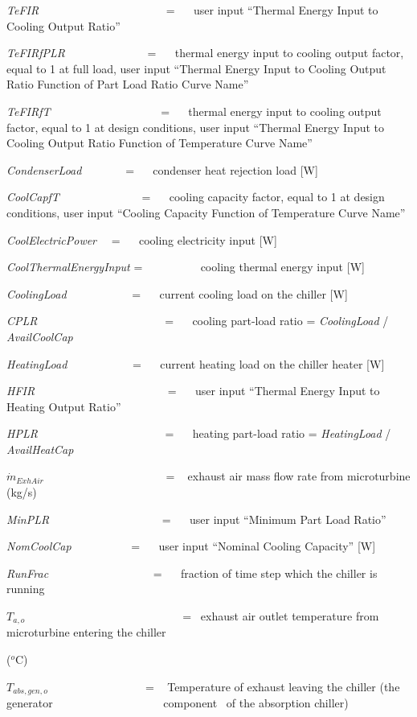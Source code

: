 \emph{TeFIR}~~~~~~~~~~~~~~~~~~~~~~ = ~~ user input ``Thermal Energy Input to Cooling Output Ratio''

\emph{TeFIRfPLR}~~~~~~~~~~~~~~ = ~~ thermal energy input to cooling output factor, equal to 1 at full load, user input ``Thermal Energy Input to Cooling Output Ratio Function of Part Load Ratio Curve Name''

\emph{TeFIRfT}~~~~~~~~~~~~~~~~~~~ = ~~ thermal energy input to cooling output factor, equal to 1 at design conditions, user input ``Thermal Energy Input to Cooling Output Ratio Function of Temperature Curve Name''

\emph{CondenserLoad~~~~~~~} = ~~ condenser heat rejection load {[}W{]}

\emph{CoolCapfT}~~~~~~~~~~~~~~ = ~~ cooling capacity factor, equal to 1 at design conditions, user input ``Cooling Capacity Function of Temperature Curve Name''

\emph{CoolElectricPower}~~ = ~~ cooling electricity input {[}W{]}

\emph{CoolThermalEnergyInput} = ~~~~~~~~~ cooling thermal energy input {[}W{]}

\emph{CoolingLoad}~~~~~~~~~~~ = ~~ current cooling load on the chiller {[}W{]}

\emph{CPLR}~~~~~~~~~~~~~~~~~~~~~~ = ~~ cooling part-load ratio = \emph{CoolingLoad} / \emph{AvailCoolCap}

\emph{HeatingLoad}~~~~~~~~~~~ = ~~ current heating load on the chiller heater {[}W{]}

\emph{HFIR}~~~~~~~~~~~~~~~~~~~~~~~ = ~~ user input ``Thermal Energy Input to Heating Output Ratio''

\emph{HPLR}~~~~~~~~~~~~~~~~~~~~~~ = ~~ heating part-load ratio = \emph{HeatingLoad} / \emph{AvailHeatCap}

\({\dot m_{ExhAir}}\) ~~~~~~ ~~~~~~~~~~~ ~~ = ~ exhaust air mass flow rate from microturbine (kg/s)

\emph{MinPLR~~~~~~~~~~~~~~~~~~~} = ~~ user input ``Minimum Part Load Ratio''

\emph{NomCoolCap}~~~~~~~~~~ = ~~ user input ``Nominal Cooling Capacity'' {[}W{]}

\emph{RunFrac}~~~~~~~~~~~~~~~~~~ = ~~ fraction of time step which the chiller is running

\({T_{a,o}}\) ~~~~~~~~~~~ ~~~~~~~~~~~~~~~ = ~exhaust air outlet temperature from microturbine entering the chiller

(\(^{o}\)C)

\({T_{abs,gen,o}}\) ~~~~~~~~~~~~~~~~ = ~ Temperature of exhaust leaving the chiller (the generator ~~~~~~~~~~~~~~~~~~~component~ of the absorption chiller)

